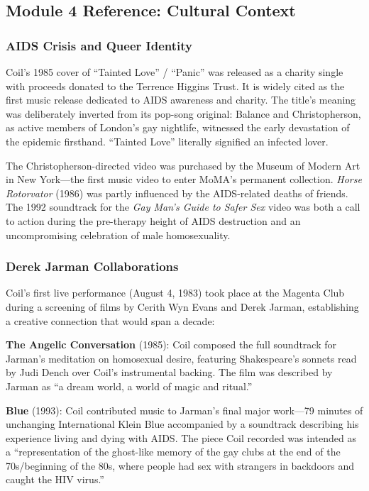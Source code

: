 \documentclass[11pt,letterpaper]{article}
\begin{document}
\subsection{Module 4 Reference: Cultural Context}

\subsubsection{AIDS Crisis and Queer Identity}

Coil's 1985 cover of ``Tainted Love'' / ``Panic'' was released as a charity single with proceeds donated to the Terrence Higgins Trust. It is widely cited as the first music release dedicated to AIDS awareness and charity. The title's meaning was deliberately inverted from its pop-song original: Balance and Christopherson, as active members of London's gay nightlife, witnessed the early devastation of the epidemic firsthand. ``Tainted Love'' literally signified an infected lover.

The Christopherson-directed video was purchased by the Museum of Modern Art in New York---the first music video to enter MoMA's permanent collection. \textit{Horse Rotorvator} (1986) was partly influenced by the AIDS-related deaths of friends. The 1992 soundtrack for the \textit{Gay Man's Guide to Safer Sex} video was both a call to action during the pre-therapy height of AIDS destruction and an uncompromising celebration of male homosexuality.

\subsubsection{Derek Jarman Collaborations}

Coil's first live performance (August 4, 1983) took place at the Magenta Club during a screening of films by Cerith Wyn Evans and Derek Jarman, establishing a creative connection that would span a decade:

\textbf{The Angelic Conversation} (1985): Coil composed the full soundtrack for Jarman's meditation on homosexual desire, featuring Shakespeare's sonnets read by Judi Dench over Coil's instrumental backing. The film was described by Jarman as ``a dream world, a world of magic and ritual.''

\textbf{Blue} (1993): Coil contributed music to Jarman's final major work---79 minutes of unchanging International Klein Blue accompanied by a soundtrack describing his experience living and dying with AIDS. The piece Coil recorded was intended as a ``representation of the ghost-like memory of the gay clubs at the end of the 70s/beginning of the 80s, where people had sex with strangers in backdoors and caught the HIV virus.''
\end{document}

